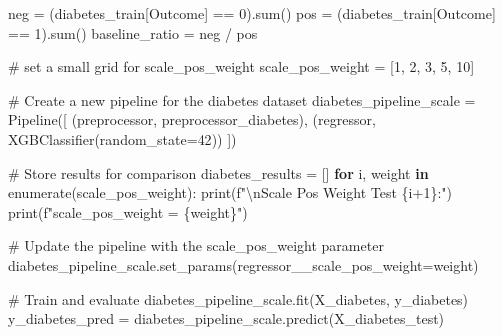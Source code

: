\documentclass[
  letterpaper,
  DIV=11,
  numbers=noendperiod]{scrreprt}
\newenvironment{Shaded}{\begin{snugshade}}{\end{snugshade}}
\newcommand{\BuiltInTok}[1]{\textcolor[rgb]{0.00,0.23,0.31}{#1}}
\newcommand{\CharTok}[1]{\textcolor[rgb]{0.13,0.47,0.30}{#1}}
\newcommand{\CommentTok}[1]{\textcolor[rgb]{0.37,0.37,0.37}{#1}}
\newcommand{\ControlFlowTok}[1]{\textcolor[rgb]{0.00,0.23,0.31}{\textbf{#1}}}
\newcommand{\DecValTok}[1]{\textcolor[rgb]{0.68,0.00,0.00}{#1}}
\newcommand{\KeywordTok}[1]{\textcolor[rgb]{0.00,0.23,0.31}{\textbf{#1}}}
\newcommand{\NormalTok}[1]{\textcolor[rgb]{0.00,0.23,0.31}{#1}}
\newcommand{\OperatorTok}[1]{\textcolor[rgb]{0.37,0.37,0.37}{#1}}
\newcommand{\SpecialCharTok}[1]{\textcolor[rgb]{0.37,0.37,0.37}{#1}}
\newcommand{\SpecialStringTok}[1]{\textcolor[rgb]{0.13,0.47,0.30}{#1}}
\newcommand{\StringTok}[1]{\textcolor[rgb]{0.13,0.47,0.30}{#1}}
\begin{document}
\begin{Shaded}
\begin{Highlighting}[]
\NormalTok{neg }\OperatorTok{=}\NormalTok{ (diabetes\_train[}\StringTok{\textquotesingle{}Outcome\textquotesingle{}}\NormalTok{] }\OperatorTok{==} \DecValTok{0}\NormalTok{).}\BuiltInTok{sum}\NormalTok{()}
\NormalTok{pos }\OperatorTok{=}\NormalTok{ (diabetes\_train[}\StringTok{\textquotesingle{}Outcome\textquotesingle{}}\NormalTok{] }\OperatorTok{==} \DecValTok{1}\NormalTok{).}\BuiltInTok{sum}\NormalTok{()}
\NormalTok{baseline\_ratio }\OperatorTok{=}\NormalTok{ neg }\OperatorTok{/}\NormalTok{ pos}

\CommentTok{\# set a small grid for scale\_pos\_weight}
\NormalTok{scale\_pos\_weight }\OperatorTok{=}\NormalTok{ [}\DecValTok{1}\NormalTok{, }\DecValTok{2}\NormalTok{, }\DecValTok{3}\NormalTok{, }\DecValTok{5}\NormalTok{, }\DecValTok{10}\NormalTok{]}

\CommentTok{\# Create a new pipeline for the diabetes dataset}
\NormalTok{diabetes\_pipeline\_scale }\OperatorTok{=}\NormalTok{ Pipeline([}
\NormalTok{    (}\StringTok{\textquotesingle{}preprocessor\textquotesingle{}}\NormalTok{, preprocessor\_diabetes),}
\NormalTok{    (}\StringTok{\textquotesingle{}regressor\textquotesingle{}}\NormalTok{, XGBClassifier(random\_state}\OperatorTok{=}\DecValTok{42}\NormalTok{))}
\NormalTok{])}

\CommentTok{\# Store results for comparison}
\NormalTok{diabetes\_results }\OperatorTok{=}\NormalTok{ []}
\ControlFlowTok{for}\NormalTok{ i, weight }\KeywordTok{in} \BuiltInTok{enumerate}\NormalTok{(scale\_pos\_weight):}
    \BuiltInTok{print}\NormalTok{(}\SpecialStringTok{f"}\CharTok{\textbackslash{}n}\SpecialStringTok{Scale Pos Weight Test }\SpecialCharTok{\{}\NormalTok{i}\OperatorTok{+}\DecValTok{1}\SpecialCharTok{\}}\SpecialStringTok{:"}\NormalTok{)}
    \BuiltInTok{print}\NormalTok{(}\SpecialStringTok{f"scale\_pos\_weight = }\SpecialCharTok{\{}\NormalTok{weight}\SpecialCharTok{\}}\SpecialStringTok{"}\NormalTok{)}
    
    \CommentTok{\# Update the pipeline with the scale\_pos\_weight parameter}
\NormalTok{    diabetes\_pipeline\_scale.set\_params(regressor\_\_scale\_pos\_weight}\OperatorTok{=}\NormalTok{weight)}
    
    \CommentTok{\# Train and evaluate}
\NormalTok{    diabetes\_pipeline\_scale.fit(X\_diabetes, y\_diabetes)}
\NormalTok{    y\_diabetes\_pred }\OperatorTok{=}\NormalTok{ diabetes\_pipeline\_scale.predict(X\_diabetes\_test)}
    

\end{Highlighting}
\end{Shaded}
\end{document}
